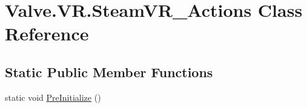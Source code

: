 \hypertarget{class_valve_1_1_v_r_1_1_steam_v_r___actions}{}\section{Valve.\+V\+R.\+Steam\+V\+R\+\_\+\+Actions Class Reference}
\label{class_valve_1_1_v_r_1_1_steam_v_r___actions}
\subsection*{Static Public Member Functions}
\begin{DoxyCompactItemize}
\item 
static void \mbox{\hyperlink{class_valve_1_1_v_r_1_1_steam_v_r___actions_a46f5f41d90f1623fee121e0fbd2dc358}{Pre\+Initialize}} ()
\end{DoxyCompactItemize}
